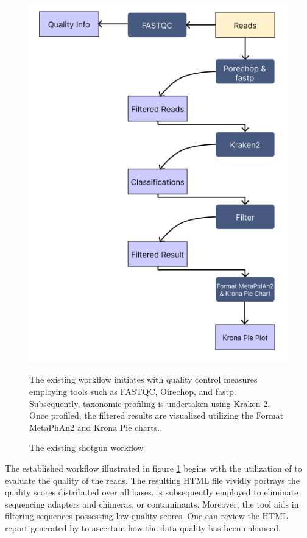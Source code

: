             \begin{figure}[H]
                \centering
                \includegraphics[scale=0.5]{images/existing_shotgun_workflow.png}
                \caption{The existing shotgun workflow}
                \small The existing workflow initiates with quality control measures employing tools such as FASTQC, Oirechop, and fastp. Subsequently, taxonomic profiling is undertaken using Kraken 2. Once profiled, the filtered results are visualized utilizing the Format MetaPhAn2 and Krona Pie charts.
                \label{fig:methods:existing_shotgun_workflow}
            \end{figure}

            The established workflow illustrated in figure \ref{fig:methods:existing_shotgun_workflow} begins with the utilization of  \cite{andrews2010fastqc} to evaluate the quality of the reads. The resulting HTML file vividly portrays the quality scores distributed over all bases.  \cite{wick2017completing} is subsequently employed to eliminate sequencing adapters and chimeras, or contaminants. Moreover, the tool  \cite{chen2018fastp} aids in filtering sequences possessing low-quality scores. One can review the HTML report generated by  to ascertain how the data quality has been enhanced.

